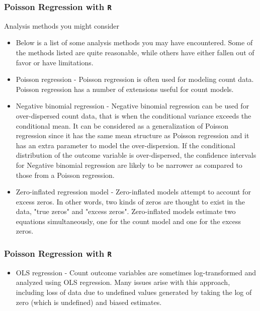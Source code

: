 \documentclass[00-GLMregslides.tex]{subfiles}
\begin{document}
\begin{frame}[fragile]
\frametitle{Poisson Regression with \texttt{R}}
\Large
Analysis methods you might consider
\begin{itemize}
\item Below is a list of some analysis methods you may have encountered. Some of the methods listed are quite reasonable, while others have either fallen out of favor or have limitations.
\item Poisson regression - Poisson regression is often used for modeling count data. Poisson regression has a number of extensions useful for count models.
\end{itemize}
\end{frame}
\begin{frame}[fragile]
	
\begin{itemize}
\item Negative binomial regression - Negative binomial regression can be used for over-dispersed count data, that is when the conditional variance exceeds the conditional mean. It can be considered as a generalization of Poisson regression since it has the same mean structure as Poisson regression and it has an extra parameter to model the over-dispersion. If the conditional distribution of the outcome variable is over-dispersed, the confidence intervals for Negative binomial regression are likely to be narrower as compared to those from a Poisson regression.
\item Zero-inflated regression model - Zero-inflated models attempt to account for excess zeros. In other words, two kinds of zeros are thought to exist in the data, "true zeros" and "excess zeros". Zero-inflated models estimate two equations simultaneously, one for the count model and one for the excess zeros.
\end{itemize}
\end{frame}

\begin{frame}[fragile]

\frametitle{Poisson Regression with \texttt{R}}
\Large

\begin{itemize}
\item OLS regression - Count outcome variables are sometimes log-transformed and analyzed using OLS regression. Many issues arise with this approach, including loss of data due to undefined values generated by taking the log of zero (which is undefined) and biased estimates.
\end{itemize}
\end{frame}
\end{document}
